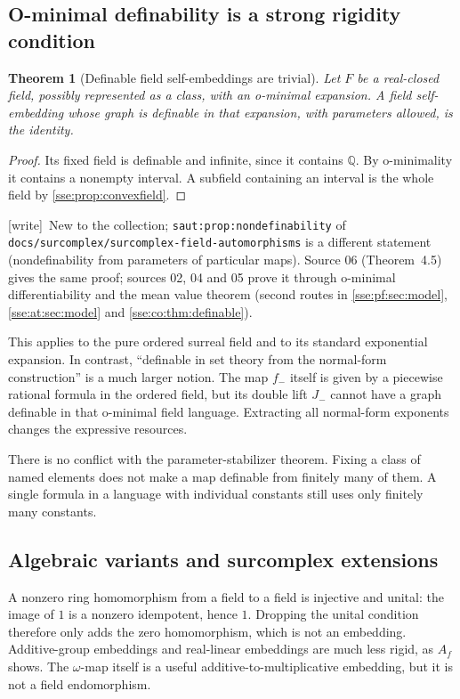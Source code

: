 \documentclass[11pt,a4paper]{article}
\numberwithin{equation}{section}
\theoremstyle{plain}
\newtheorem{theorem}{Theorem}[section]
\theoremstyle{definition}
\theoremstyle{remark}
\newcommand{\Q}{\mathbb{Q}}
\newcommand{\lbl}[1]{\nolinkurl{#1}}%
\newcommand{\fn}[1]{\nolinkurl{#1}}%
\newcommand{\wtag}{\textup{\textsf{[write]}}}%
\newenvironment{wnote}{\par\smallskip\noindent\wtag\ }{\par\smallskip}
\begin{document}
\subsection{O-minimal definability is a strong rigidity condition}
\begin{theorem}[Definable field self-embeddings are trivial]
\label{sse:thm:definable}
Let $F$ be a real-closed field, possibly represented as a class, with an
o-minimal expansion. A field self-embedding whose graph is definable in
that expansion, with parameters allowed, is the identity.
\end{theorem}
\begin{proof}
Its fixed field is definable and infinite, since it contains $\Q$.
By o-minimality it contains a nonempty interval. A subfield containing an
interval is the whole field by \cref{sse:prop:convexfield}.
\end{proof}
\begin{wnote}New to the collection; \lbl{saut:prop:nondefinability} of \fn{docs/surcomplex/surcomplex-field-automorphisms} is a different statement (nondefinability from parameters of particular maps). Source 06 (Theorem~4.5) gives the same proof; sources 02, 04 and 05 prove it through o-minimal differentiability and the mean value theorem (second routes in \cref{sse:pf:sec:model}, \cref{sse:at:sec:model} and \cref{sse:co:thm:definable}).\end{wnote}
This applies to the pure ordered surreal field and to its standard
exponential expansion. In contrast, ``definable in set theory from the
normal-form construction'' is a much larger notion. The map $f_-$ itself
is given by a piecewise rational formula in the ordered field, but its
double lift $J_-$ cannot have a graph definable in that o-minimal field
language. Extracting all normal-form exponents changes the expressive
resources.

There is no conflict with the parameter-stabilizer theorem. Fixing a class
of named elements does not make a map definable from finitely many of them.
A single formula in a language with individual constants still uses only
finitely many constants.

\subsection{Algebraic variants and surcomplex extensions}
A nonzero ring homomorphism from a field to a field is injective and
unital: the image of $1$ is a nonzero idempotent, hence $1$. Dropping the
unital condition therefore only adds the zero homomorphism, which is not
an embedding. Additive-group embeddings and real-linear embeddings are
much less rigid, as $A_f$ shows. The $\omega$-map itself is a useful
additive-to-multiplicative embedding, but it is not a field endomorphism.
\end{document}
